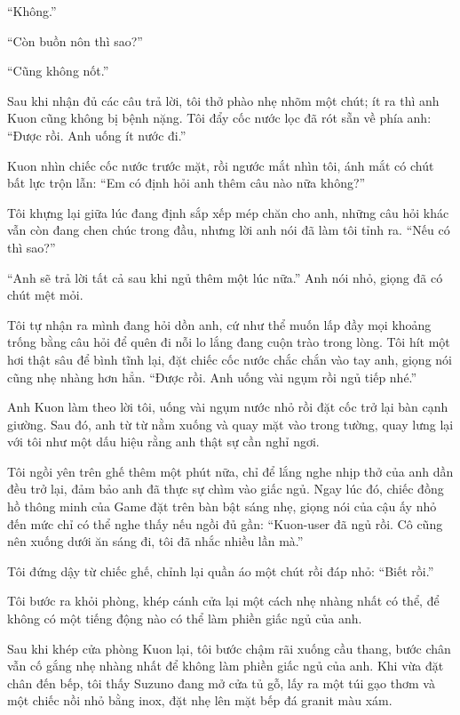 \documentclass[../main.tex]{subfiles}
\begin{document}
``Không.''

``Còn buồn nôn thì sao?''

``Cũng không nốt.''

Sau khi nhận đủ các câu trả lời, tôi thở phào nhẹ nhõm một chút; ít ra thì anh Kuon cũng không bị bệnh nặng. Tôi đẩy cốc nước lọc đã rót sẵn về phía anh: ``Được rồi. Anh uống ít nước đi.''

Kuon nhìn chiếc cốc nước trước mặt, rồi ngước mắt nhìn tôi, ánh mắt có chút bất lực trộn lẫn: ``Em có định hỏi anh thêm câu nào nữa không?''

Tôi khựng lại giữa lúc đang định sắp xếp mép chăn cho anh, những câu hỏi khác vẫn còn đang chen chúc trong đầu, nhưng lời anh nói đã làm tôi tỉnh ra. ``Nếu có thì sao?''

``Anh sẽ trả lời tất cả sau khi ngủ thêm một lúc nữa.'' Anh nói nhỏ, giọng đã có chút mệt mỏi.

Tôi tự nhận ra mình đang hỏi dồn anh, cứ như thể muốn lấp đầy mọi khoảng trống bằng câu hỏi để quên đi nỗi lo lắng đang cuộn trào trong lòng. Tôi hít một hơi thật sâu để bình tĩnh lại, đặt chiếc cốc nước chắc chắn vào tay anh, giọng nói cũng nhẹ nhàng hơn hẳn. ``Được rồi. Anh uống vài ngụm rồi ngủ tiếp nhé.''

Anh Kuon làm theo lời tôi, uống vài ngụm nước nhỏ rồi đặt cốc trở lại bàn cạnh giường. Sau đó, anh từ từ nằm xuống và quay mặt vào trong tường, quay lưng lại với tôi như một dấu hiệu rằng anh thật sự cần nghỉ ngơi.

Tôi ngồi yên trên ghế thêm một phút nữa, chỉ để lắng nghe nhịp thở của anh dần đều trở lại, đảm bảo anh đã thực sự chìm vào giấc ngủ. Ngay lúc đó, chiếc đồng hồ thông minh của Game đặt trên bàn bật sáng nhẹ, giọng nói của cậu ấy nhỏ đến mức chỉ có thể nghe thấy nếu ngồi đủ gần: ``Kuon-user đã ngủ rồi. Cô cũng nên xuống dưới ăn sáng đi, tôi đã nhắc nhiều lần mà.''

Tôi đứng dậy từ chiếc ghế, chỉnh lại quần áo một chút rồi đáp nhỏ: ``Biết rồi.''

Tôi bước ra khỏi phòng, khép cánh cửa lại một cách nhẹ nhàng nhất có thể, để không có một tiếng động nào có thể làm phiền giấc ngủ của anh.

\ct

Sau khi khép cửa phòng Kuon lại, tôi bước chậm rãi xuống cầu thang, bước chân vẫn cố gắng nhẹ nhàng nhất để không làm phiền giấc ngủ của anh. Khi vừa đặt chân đến bếp, tôi thấy Suzuno đang mở cửa tủ gỗ, lấy ra một túi gạo thơm và một chiếc nồi nhỏ bằng inox, đặt nhẹ lên mặt bếp đá granit màu xám. 
\end{document}
